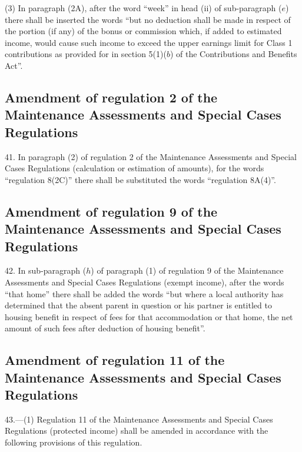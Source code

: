 \documentclass[12pt,a4paper]{article}
\begin{document}
(3) In paragraph (2A), after the word “week” in head (ii) of sub-paragraph ($e$) there shall be inserted the words “but no deduction shall be made in respect of the portion (if any) of the bonus or commission which, if added to estimated income, would cause such income to exceed the upper earnings limit for Class 1 contributions as provided for in section 5(1)($b$) of the Contributions and Benefits Act”.

\subsection[41. Amendment of regulation 2 of the Maintenance Assessments and Special Cases Regulations]{Amendment of regulation 2 of the Maintenance Assessments and Special Cases Regulations}

41.  In paragraph (2) of regulation 2 of the Maintenance Assessments and Special Cases Regulations (calculation or estimation of amounts), for the words “regulation 8(2C)” there shall be substituted the words “regulation 8A(4)”.

\subsection[42. Amendment of regulation 9 of the Maintenance Assessments and Special Cases Regulations]{Amendment of regulation 9 of the Maintenance Assessments and Special Cases Regulations}

42.  In sub-paragraph ($h$) of paragraph (1) of regulation 9 of the Maintenance Assessments and Special Cases Regulations (exempt income), after the words “that home” there shall be added the words “but where a local authority has determined that the absent parent in question or his partner is entitled to housing benefit in respect of fees for that accommodation or that home, the net amount of such fees after deduction of housing benefit”.

\subsection[43. Amendment of regulation 11 of the Maintenance Assessments and Special Cases Regulations]{Amendment of regulation 11 of the Maintenance Assessments and Special Cases Regulations}

43.—(1) Regulation 11 of the Maintenance Assessments and Special Cases Regulations (protected income) shall be amended in accordance with the following provisions of this regulation.
\end{document}
